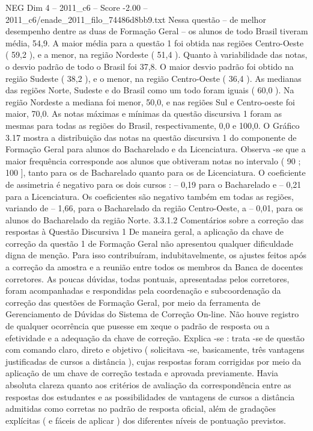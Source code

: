 \begin{textsample}{NEG Dim 4 – 2011\_c6 – Score -2.00 – 2011\_c6/enade\_2011\_filo\_74486d8bb9.txt}
Nessa questão – de melhor desempenho dentre as duas de Formação Geral – os alunos de todo Brasil tiveram média, 54,9.
A maior média para a questão 1 foi obtida nas regiões Centro-Oeste ( 59,2 ), e a menor, na região Nordeste ( 51,4 ).
Quanto à variabilidade das notas, o desvio padrão de todo o Brasil foi 37,8.
O maior desvio padrão foi obtido na região Sudeste ( 38,2 ), e o menor, na região Centro-Oeste ( 36,4 ).
As medianas das regiões Norte, Sudeste e do Brasil como um todo foram iguais ( 60,0 ).
Na região Nordeste a mediana foi menor, 50,0, e nas regiões Sul e Centro-oeste foi maior, 70,0.
As notas máximas e mínimas da questão discursiva 1 foram as mesmas para todas as regiões do Brasil, respectivamente, 0,0 e 100,0.
O Gráfico 3.17 mostra a distribuição das notas na questão discursiva 1 do componente de Formação Geral para alunos do Bacharelado e da Licenciatura.
Observa -se que a maior frequência corresponde aos alunos que obtiveram notas no intervalo ( 90 ; 100 ], tanto para os de Bacharelado quanto para os de Licenciatura.
O coeficiente de assimetria é negativo para os dois cursos : – 0,19 para o Bacharelado e – 0,21 para a Licenciatura.
Os coeficientes são negativo também em todas as regiões, variando de – 1,66, para o Bacharelado da região Centro-Oeste, a – 0,01, para os alunos do Bacharelado da região Norte. 3.3.1.2 Comentários sobre a correção das respostas à Questão Discursiva 1 De maneira geral, a aplicação da chave de correção da questão 1 de Formação Geral não apresentou qualquer dificuldade digna de menção.
Para isso contribuíram, indubitavelmente, os ajustes feitos após a correção da amostra e a reunião entre todos os membros da Banca de docentes corretores.
As poucas dúvidas, todas pontuais, apresentadas pelos corretores, foram acompanhadas e respondidas pela coordenação e subcoordenação da correção das questões de Formação Geral, por meio da ferramenta de Gerenciamento de Dúvidas do Sistema de Correção On-line.
Não houve registro de qualquer ocorrência que pusesse em xeque o padrão de resposta ou a efetividade e a adequação da chave de correção.
Explica -se : trata -se de questão com comando claro, direto e objetivo ( solicitava -se, basicamente, três vantagens justificadas de cursos a distância ), cujas respostas foram corrigidas por meio da aplicação de um chave de correção testada e aprovada previamente.
Havia absoluta clareza quanto aos critérios de avaliação da correspondência entre as respostas dos estudantes e as possibilidades de vantagens de cursos a distância admitidas como corretas no padrão de resposta oficial, além de gradações explícitas ( e fáceis de aplicar ) dos diferentes níveis de pontuação previstos.

\end{textsample}
